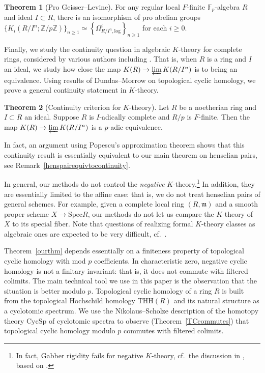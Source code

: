 \documentclass{amsart}
\newcommand{\THH}{\mathrm{THH}}
\newcommand{\spec}{\mathrm{Spec}}
\theoremstyle{definition}
\newtheorem{thm}{Theorem}
\newcommand{\CycSp}{\mathrm{CycSp}}
\begin{document}
\begin{thm}[Pro Geisser--Levine]
For any regular local $F$-finite $\mathbb{F}_p$-algebra $R$ and ideal $I \subset R$, 
there is an isomorphism of pro abelian groups
$\{K_i(R/I^n; \mathbb{Z}/p \mathbb{Z})\}_{n \geq 1} \simeq \left\{\Omega^i_{R/I^n,
\mathrm{log}}\right\}_{n \geq 1}$ for each $i \geq 0$. 
\end{thm}
Finally, we 
study the {continuity} question in algebraic $K$-theory for complete rings, considered by various
authors including \cite{GHlocal, dundas, Suslinlocal, Morrow-HW, Panin}. 
That is, when $R$ is a ring and $I$ an ideal, we study how close the map $K(R)
\to \varprojlim K(R/I^n)$ is to being an equivalence. 
Using results of
Dundas--Morrow \cite{DundasMorrow} on topological cyclic homology, we prove a general
continuity statement in $K$-theory. 
\begin{thm}[Continuity criterion for $K$-theory] 
Let $R$ be a noetherian ring and $I \subset R$ an ideal. Suppose $R$ is
$I$-adically complete and $R/p$ is $F$-finite. 
Then the map $K(R) \to \varprojlim K(R/I^n)$ is a $p$-adic equivalence. 
\end{thm} 

In fact, an argument using Popescu's approximation theorem shows that this
continuity result is essentially equivalent to our main theorem on henselian
pairs, see Remark~\ref{henspairequivtocontinuity}.

In general, our methods do not control the \emph{negative}
$K$-theory.\footnote{In fact,
Gabber rigidity fails for negative $K$-theory, cf.~the discussion in
\cite[Ex.~8.5]{Wei91}, based on \cite{Rei87}.} 
In
addition, they are essentially limited to the affine case: that is, 
we do not treat henselian pairs of general schemes. 
For example, given a complete local ring $(R, \mathfrak{m})$ and a smooth
proper scheme $X \to \spec R$, our methods 
do not let us compare the $K$-theory of $X$ to its special fiber. Note that 
questions of realizing formal $K$-theory classes as algebraic ones are expected
to be very difficult, cf.~\cite{BEK}. 


Theorem~\ref{ourthm} depends essentially on a finiteness property
of topological cyclic homology with mod $p$ coefficients. 
In characteristic zero, negative cyclic homology is not a finitary invariant: that is, it
does not commute with filtered colimits.  The main technical tool we use in this paper is the observation that the situation is better modulo
$p$. 
Topological cyclic homology of a ring $R$ is built from the topological
Hochschild homology $\THH(R)$ and its natural structure as a cyclotomic spectrum. 
We use the Nikolaus--Scholze
\cite{nikolaus-scholze} description of the homotopy theory $\CycSp$ of
cyclotomic spectra to observe (Theorem~\ref{TCcommutes}) that topological cyclic homology modulo $p$ commutes with filtered colimits. 
\end{document}
